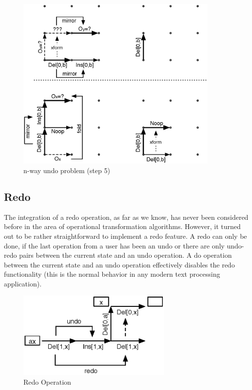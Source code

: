\begin{figure}[H]
 \centering
 \includegraphics[width=10cm,height=8.69cm]{../../images/concepts_transformation-history-5.eps}
 \caption{n-way undo problem (step 5)}
 \label{fig:concepts.transformation-history-5}
\end{figure}


\subsection{Redo}
The integration of a redo operation, as far as we know, has never been considered before in the area of operational transformation algorithms. However, it turned out to be rather straightforward to implement a redo feature. A redo can only be done, if the last operation from a user has been an undo or there are only undo-redo pairs between the current state and an undo operation. A do operation between the current state and an undo operation effectively disables the redo functionality (this is the normal behavior in any modern text processing application).

\begin{figure}[htb]
 \centering
 \includegraphics[width=7.62cm,height=4.34cm]{../../images/concepts_redo.eps}
 \caption{Redo Operation}
 \label{fig:concepts.redo}
\end{figure}

